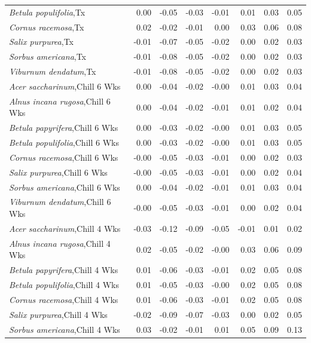 \documentclass{article}\usepackage[]{graphicx}\usepackage[]{color}
\begin{document}
\begin{longtable}{lrrrrrrr}
  \textit{Betula populifolia},Tx & 0.00 & -0.05 & -0.03 & -0.01 & 0.01 & 0.03 & 0.05 \\ 
  \textit{Cornus racemosa},Tx & 0.02 & -0.02 & -0.01 & 0.00 & 0.03 & 0.06 & 0.08 \\ 
  \textit{Salix purpurea},Tx & -0.01 & -0.07 & -0.05 & -0.02 & 0.00 & 0.02 & 0.03 \\ 
  \textit{Sorbus americana},Tx & -0.01 & -0.08 & -0.05 & -0.02 & 0.00 & 0.02 & 0.03 \\ 
  \textit{Viburnum dendatum},Tx & -0.01 & -0.08 & -0.05 & -0.02 & 0.00 & 0.02 & 0.03 \\ 
  \textit{Acer saccharinum},Chill 6 Wks & 0.00 & -0.04 & -0.02 & -0.00 & 0.01 & 0.03 & 0.04 \\ 
  \textit{Alnus incana rugosa},Chill 6 Wks & 0.00 & -0.04 & -0.02 & -0.01 & 0.01 & 0.02 & 0.04 \\ 
  \textit{Betula papyrifera},Chill 6 Wks & 0.00 & -0.03 & -0.02 & -0.00 & 0.01 & 0.03 & 0.05 \\ 
  \textit{Betula populifolia},Chill 6 Wks & 0.00 & -0.03 & -0.02 & -0.00 & 0.01 & 0.03 & 0.05 \\ 
  \textit{Cornus racemosa},Chill 6 Wks & -0.00 & -0.05 & -0.03 & -0.01 & 0.00 & 0.02 & 0.03 \\ 
  \textit{Salix purpurea},Chill 6 Wks & -0.00 & -0.05 & -0.03 & -0.01 & 0.00 & 0.02 & 0.04 \\ 
  \textit{Sorbus americana},Chill 6 Wks & 0.00 & -0.04 & -0.02 & -0.01 & 0.01 & 0.03 & 0.04 \\ 
  \textit{Viburnum dendatum},Chill 6 Wks & -0.00 & -0.05 & -0.03 & -0.01 & 0.00 & 0.02 & 0.04 \\ 
  \textit{Acer saccharinum},Chill 4 Wks & -0.03 & -0.12 & -0.09 & -0.05 & -0.01 & 0.01 & 0.02 \\ 
  \textit{Alnus incana rugosa},Chill 4 Wks & 0.02 & -0.05 & -0.02 & -0.00 & 0.03 & 0.06 & 0.09 \\ 
  \textit{Betula papyrifera},Chill 4 Wks & 0.01 & -0.06 & -0.03 & -0.01 & 0.02 & 0.05 & 0.08 \\ 
  \textit{Betula populifolia},Chill 4 Wks & 0.01 & -0.05 & -0.03 & -0.00 & 0.02 & 0.05 & 0.08 \\ 
  \textit{Cornus racemosa},Chill 4 Wks & 0.01 & -0.06 & -0.03 & -0.01 & 0.02 & 0.05 & 0.08 \\ 
  \textit{Salix purpurea},Chill 4 Wks & -0.02 & -0.09 & -0.07 & -0.03 & 0.00 & 0.02 & 0.05 \\ 
  \textit{Sorbus americana},Chill 4 Wks & 0.03 & -0.02 & -0.01 & 0.01 & 0.05 & 0.09 & 0.13 \\ 

\end{longtable}
\end{document}
